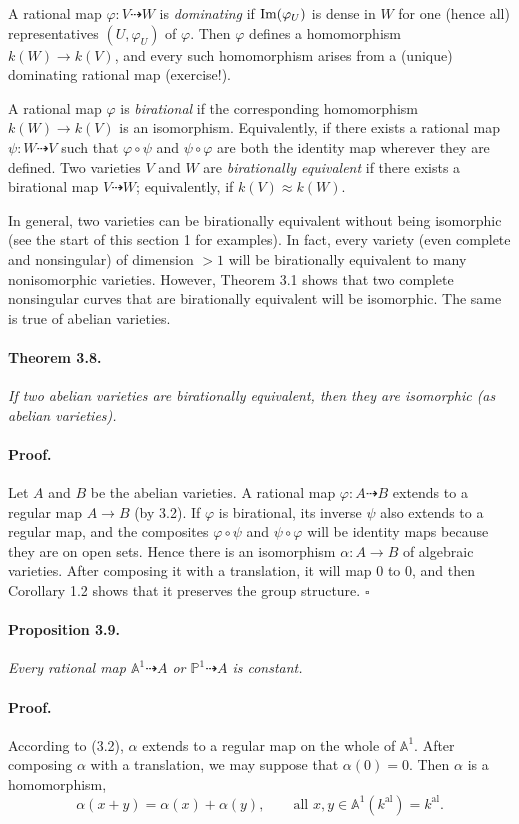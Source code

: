 A rational map $\varphi\colon V \dashrightarrow W$ is \textit{dominating} if
$\operatorname{Im}(\varphi_U)$ is dense in $W$ for one (hence all) representatives
$(U, \varphi_U)$ of $\varphi$. Then $\varphi$ defines a homomorphism
$k(W) \to k(V)$, and every such homomorphism arises from a (unique) dominating
rational map (exercise!).

A rational map $\varphi$ is \textit{birational} if the corresponding
homomorphism $k(W) \to k(V)$ is an isomorphism. Equivalently, if there exists a
rational map $\psi\colon W \dashrightarrow V$ such that $\varphi \circ \psi$
and $\psi \circ \varphi$ are both the identity map wherever they are defined.
Two varieties $V$ and $W$ are \textit{birationally equivalent} if there exists
a birational map $V \dashrightarrow W$; equivalently, if $k(V) \approx k(W)$.

In general, two varieties can be birationally equivalent without being
isomorphic (see the start of this section 1 for examples). In fact, every
variety (even complete and nonsingular) of dimension $> 1$ will be birationally
equivalent to many nonisomorphic varieties. However, Theorem 3.1 shows that two
complete nonsingular curves that are birationally equivalent will be isomorphic.
The same is true of abelian varieties.

\paragraph{Theorem 3.8.}
\textit{If two abelian varieties are birationally equivalent, then they are
isomorphic (as abelian varieties).}

\paragraph{Proof.}
Let $A$ and $B$ be the abelian varieties. A rational map
$\varphi\colon A \dashrightarrow B$ extends to a regular map $A \to B$ (by
3.2). If $\varphi$ is birational, its inverse $\psi$ also extends to a regular
map, and the composites $\varphi \circ \psi$ and $\psi \circ \varphi$ will be
identity maps because they are on open sets. Hence there is an isomorphism
$\alpha\colon A \to B$ of algebraic varieties. After composing it with a
translation, it will map 0 to 0, and then Corollary 1.2 shows that it preserves
the group structure. \hfill $\square$

\paragraph{Proposition 3.9.}
\textit{Every rational map $\mathbb{A}^1 \dashrightarrow A$ or
$\mathbb{P}^1 \dashrightarrow A$ is constant.}

\paragraph{Proof.}
According to (3.2), $\alpha$ extends to a regular map on the whole of
$\mathbb{A}^1$. After composing $\alpha$ with a translation, we may suppose
that $\alpha(0) = 0$. Then $\alpha$ is a homomorphism,
\[
  \alpha(x + y) = \alpha(x) + \alpha(y), \qquad
  \text{all } x,y \in \mathbb{A}^1(k^{\mathrm{al}}) = k^{\mathrm{al}}.
\]

